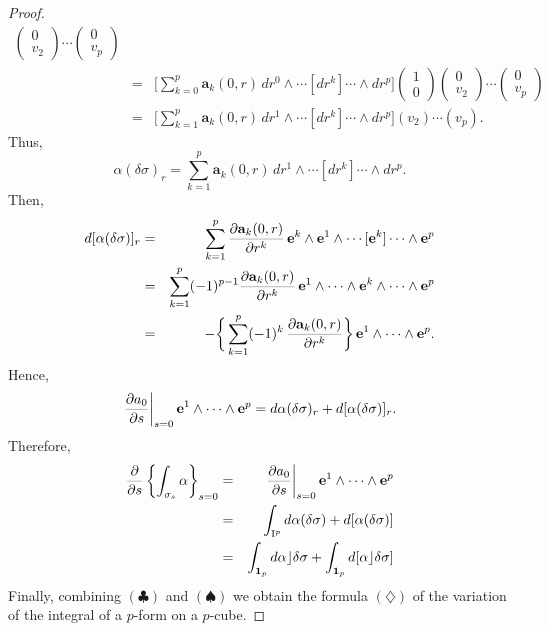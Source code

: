 \documentclass[11pt,reqno]{amsart}
\theoremstyle{definition}
\renewcommand{\over}{\above .2pt}
\renewcommand{\aa}{{\mathbf a}}
\newcommand{\ee}{{\mathbf e}}
\newcommand{\cub}[1]{{\rm I}^{#1}}
\newcommand{\Der}{\partial}
\newcommand{\id}{{\bf 1}}
\begin{document}
\begin{proof}
\begin{eqnarray*}
      \begin{pmatrix} 0 \\ v_2 \end{pmatrix} 
      \cdots 
      \begin{pmatrix} 0 \\ v_p \end{pmatrix} \\
      & = & \bigg[\sum_{k = 0}^p \aa_k(0,r) \, dr^0\wedge
		\cdots [dr^k] \cdots \wedge dr^p \bigg]
    \begin{pmatrix} 1 \\ 0 \end{pmatrix}
    \begin{pmatrix} 0 \\ v_2 \end{pmatrix} 
    \cdots 
    \begin{pmatrix} 0 \\ v_p \end{pmatrix} \\
			& = & \bigg[\sum_{k=1}^p \aa_k(0,r) \, dr^1 \wedge \cdots
			[dr^k] \cdots \wedge dr^p\bigg](v_2) \cdots (v_p).
		\end{eqnarray*}
    Thus,
    $$
		\alpha(\delta\sigma)_r  = \sum_{k=1}^p \aa_k(0,r) \, dr^1 \wedge \cdots
			[dr^k] \cdots \wedge dr^p. 
		$$
    Then,
    \begin{eqnarray*}
      d[\alpha(\delta \sigma)]_r & = & \sum_{k=1}^p
      {\partial \aa_k(0,r) \over \partial r^k}\, \ee^k \wedge
      \ee^1 \wedge \cdots [\ee^k] \cdots \wedge \ee^p \\
      & = & \sum_{k=1}^p (-1)^{p-1}
      {\partial \aa_k(0,r) \over \partial r^k} \, \ee^1
      \wedge \cdots \wedge \ee^k \wedge \cdots \wedge \ee^p \\
      & = & - \bigg\{ \sum_{k = 1}^p (-1)^k
      \,{\Der \aa_k(0,r) \over \Der r^k} \bigg\}  \,
      \ee^1 \wedge \cdots \wedge \ee^p.
    \end{eqnarray*}
    Hence,
    $$
      \left. {\Der a_0 \over \Der s}\right|_{s=0}
      \ee^1\wedge\cdots \wedge \ee^p  = 
      d\alpha(\delta\sigma)_r + d[\alpha(\delta\sigma)]_r.
      $$
    Therefore,
    \renewcommand{\theequation}{$\spadesuit$}
    \begin{eqnarray} 
      {\Der \over \Der s} \left\{\int_{\sigma_s}\alpha\right\}_{s = 0}
      & = & \left. {\Der a_0 \over \Der s}\right|_{s=0}
      \ee^1 \wedge \cdots \wedge \ee^p \nonumber \\
      & = &\int_{\cub{p}}
      d\alpha(\delta\sigma) + d[\alpha(\delta\sigma)] \nonumber
      \\
      & = & \int_{\id_p} d\alpha \rfloor \delta\sigma +
      \int_{\id_p} d[\alpha \rfloor \delta\sigma]
    \end{eqnarray}
    Finally, combining $(\clubsuit)$ and $(\spadesuit)$ we
    obtain the formula $(\diamondsuit)$ of the variation of the
    integral of a $p$-form on a $p$-cube.
  \end{proof}
  
\end{document}
